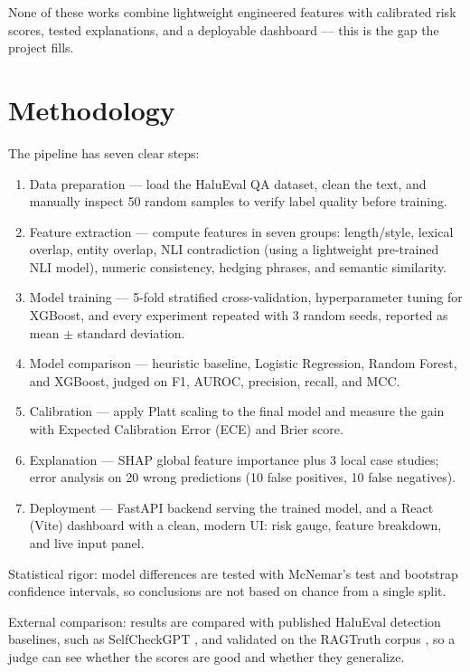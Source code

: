 \documentclass[12pt,a4paper]{article}
\begin{document}
None of these works combine lightweight engineered features with calibrated risk scores, tested explanations, and a deployable dashboard --- this is the gap the project fills.

\section{Methodology}

The pipeline has seven clear steps:

\begin{enumerate}
    \item Data preparation --- load the HaluEval QA dataset, clean the text, and manually inspect 50 random samples to verify label quality before training.
    \item Feature extraction --- compute features in seven groups: length/style, lexical overlap, entity overlap, NLI contradiction (using a lightweight pre-trained NLI model), numeric consistency, hedging phrases, and semantic similarity.
    \item Model training --- 5-fold stratified cross-validation, hyperparameter tuning for XGBoost, and every experiment repeated with 3 random seeds, reported as mean $\pm$ standard deviation.
    \item Model comparison --- heuristic baseline, Logistic Regression, Random Forest, and XGBoost, judged on F1, AUROC, precision, recall, and MCC.
    \item Calibration --- apply Platt scaling to the final model \cite{costeff} and measure the gain with Expected Calibration Error (ECE) and Brier score.
    \item Explanation --- SHAP global feature importance plus 3 local case studies; error analysis on 20 wrong predictions (10 false positives, 10 false negatives).
    \item Deployment --- FastAPI backend serving the trained model, and a React (Vite) dashboard with a clean, modern UI: risk gauge, feature breakdown, and live input panel.
\end{enumerate}

Statistical rigor: model differences are tested with McNemar's test and bootstrap confidence intervals, so conclusions are not based on chance from a single split.

External comparison: results are compared with published HaluEval detection baselines, such as SelfCheckGPT \cite{selfcheck}, and validated on the RAGTruth corpus \cite{ragtruth}, so a judge can see whether the scores are good and whether they generalize.
\end{document}
